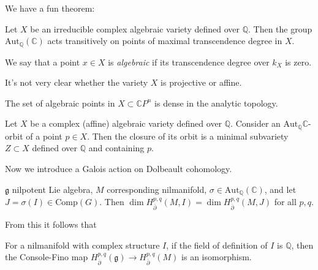 \noindent
We have a fun theorem:

\begin{theorem}
\label{theorem-fun-theorem}
Let $X$ be an irreducible complex algebraic
variety defined over $\mathbb{Q}$.
Then the group
$\text{Aut}_\mathbb{Q}(\mathbb{C})$ acts
transitively
on points of maximal transcendence degree in
$X$.
\end{theorem}

\begin{definition}
\label{definition-algebraic-point}
We say that a point $x \in X$ is {\it
algebraic} if
its transcendence degree over $k_X$ is zero.
\end{definition}

\noindent
It's not very clear whether the variety $X$
is projective or affine.

\begin{lemma}
\label{lemma-algebraic-points-are-dense}
The set of algebraic points in
$X\subset\mathbb{C}P^n$ is dense
in the analytic topology.
\end{lemma}

\begin{theorem}
\label{theorem-aut-orbit-of-point}
Let $X$ be a complex (affine) algebraic
variety defined over $\mathbb{Q}$.
Consider an
$\text{Aut}_{\mathbb{Q}}\mathbb{C}$-orbit of
a point
$p \in X$. Then the closure of its orbit is a
minimal subvariety $Z \subset X$ defined
over $\mathbb{Q}$ and containing $p$.
\end{theorem}

\noindent
Now we introduce a Galois action on Dolbeault
cohomology.

\begin{theorem}
\label{theorem-}
$\mathfrak{g}$ nilpotent Lie algebra, $M$
corresponding nilmanifold,
$\sigma \in
\text{Aut}_{\mathbb{Q}}(\mathbb{C})$,
and let $J=\sigma(I) \in \text{Comp}(G)$.
Then $\dim H^{p,q}_{\overline{\partial}}(M,I)
=\dim H^{p,q}_{\overline{\partial}}(M,J)$ for
all $p,q$.
\end{theorem}

From this it follows that

\begin{lemma}
\label{lemma-console-fino-complex-structure}
For a nilmanifold with complex structure $I$,
if the field of definition of $I$ is
$\mathbb{Q}$,
then the Console-Fino map
$H_{\overline{\partial}}^{p,q}(\mathfrak{g})
\to
H_{\overline{\partial}}^{p,q}(M)$ is an
isomorphism.
\end{lemma}

